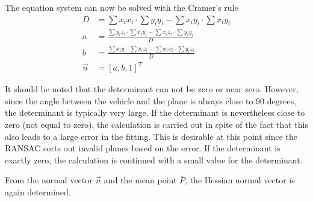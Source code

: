 \documentclass[11pt,oneside,openright]{mpreport}
\begin{document}
The equation system can now be solved with the Cramer's rule
\begin{align*}
D &= \sum x_i x_i \cdot \sum y_i y_i - \sum x_i y_i \cdot \sum x_i y_i \\
a &= \frac{\sum y_i z_i \cdot \sum x_i y_i - \sum x_i z_i \cdot \sum y_i y_i }{D}\\
b &= \frac{\sum x_i y_i \cdot \sum x_i z_i - \sum x_i x_i \cdot \sum y_i z_i }{D}\\
\vec{n} &= [a, b, 1]^T
\end{align*}

It should be noted that the determinant can not be zero or near zero. However, since the angle between the vehicle and the plane is always close to 90 degrees,
the determinant is typically very large. If the determinant is nevertheless close to zero (not equal to zero), the calculation is carried out in spite of the fact that
this also leads to a large error in the fitting. This is desirable at this point since the \ac{RANSAC} sorts out invalid planes based on the error.
If the determinant is exactly zero, the calculation is continued with a small value for the determinant.

% 

From the normal vector $\vec{n}$ and the mean point $\overline{P}$,  the Hessian normal vector is again determined.
\end{document}
